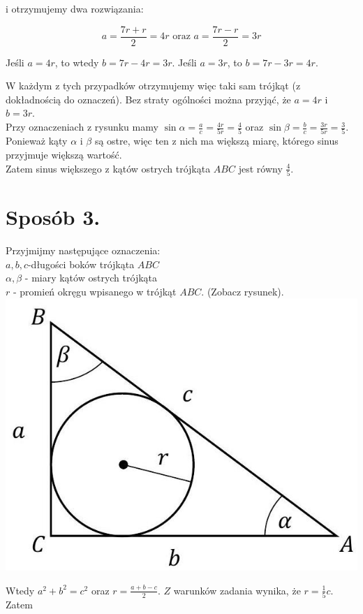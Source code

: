 \documentclass[10pt]{article}
\begin{document}
i otrzymujemy dwa rozwiązania:

$$
a=\frac{7 r+r}{2}=4 r \text { oraz } a=\frac{7 r-r}{2}=3 r
$$

Jeśli $a=4 r$, to wtedy $b=7 r-4 r=3 r$. Jeśli $a=3 r$, to $b=7 r-3 r=4 r$.

W każdym z tych przypadków otrzymujemy więc taki sam trójkąt (z dokładnością do oznaczeń). Bez straty ogólności można przyjąć, że $a=4 r$ i $b=3 r$.\\
Przy oznaczeniach z rysunku mamy $\sin \alpha=\frac{a}{c}=\frac{4 r}{5 r}=\frac{4}{5}$ oraz $\sin \beta=\frac{b}{c}=\frac{3 r}{5 r}=\frac{3}{5}$. Ponieważ kąty $\alpha$ i $\beta$ są ostre, więc ten z nich ma większą miarę, którego sinus przyjmuje większą wartość.\\
Zatem sinus większego z kątów ostrych trójkąta $A B C$ jest równy $\frac{4}{5}$.

\section*{Sposób 3.}
Przyjmijmy następujące oznaczenia:\\
$a, b, c$-długości boków trójkąta $A B C$\\
$\alpha, \beta$ - miary kątów ostrych trójkąta\\
$r$ - promień okręgu wpisanego w trójkąt $A B C$. (Zobacz rysunek).\\
\includegraphics[max width=\textwidth, center]{2025_02_07_36131546116d12814c9cg-41}

Wtedy $a^{2}+b^{2}=c^{2}$ oraz $r=\frac{a+b-c}{2}$. $Z$ warunków zadania wynika, że $r=\frac{1}{5} c$. Zatem
\end{document}
